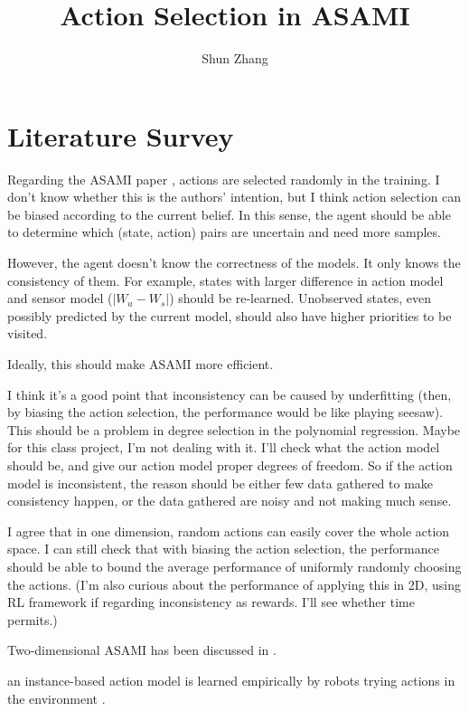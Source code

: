 \documentclass[10pt]{article}
\title{Action Selection in ASAMI}
\author{Shun Zhang}
\date{}
\begin{document}
\maketitle


\sloppy
\section{Literature Survey}

Regarding the ASAMI paper \cite{CSJ06}, actions are selected randomly
in the training. I don't know whether this is the authors' intention,
but I think action selection can be biased according to the current
belief.  In this sense, the agent should be able to determine which
(state, action) pairs are uncertain and need more samples.

However, the agent doesn't know the correctness of the models. It only
knows the consistency of them. For example, states with larger
difference in action model and sensor model ($|W_a - W_s|$) should be
re-learned.  Unobserved states, even possibly predicted by the current
model, should also have higher priorities to be visited.

Ideally, this should make ASAMI more efficient.

I think it's a good point that inconsistency can be caused by
underfitting (then, by biasing the action selection, the performance
would be like playing seesaw). This should be a problem in degree
selection in the polynomial regression. Maybe for this class project,
I'm not dealing with it. I'll check what the action model should be,
and give our action model proper degrees of freedom. So if the action
model is inconsistent, the reason should be either few data gathered
to make consistency happen, or the data gathered are noisy and not
making much sense.

I agree that in one dimension, random actions can easily cover the
whole action space. I can still check that with biasing the action
selection, the performance should be able to bound the average
performance of uniformly randomly choosing the actions. (I'm also
curious about the performance of applying this in 2D, using RL
framework if regarding inconsistency as rewards.  I'll see whether
time permits.)

Two-dimensional ASAMI has been discussed in \cite{ICRA08-stronger}.

an instance-based action model is learned empirically by robots trying
actions in the environment \cite{LNAI2007-ahmadi}.




\end{document}
